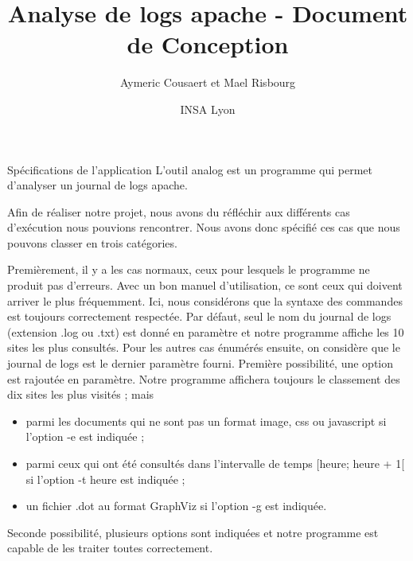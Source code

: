 \documentclass[11pt]{article}
\date{INSA Lyon}
\title{Analyse de logs apache - Document de Conception}
\author{Aymeric Cousaert et Mael Risbourg}
\begin{document}
\maketitle

\vspace{1cm}
\tableofcontents
\vspace{1cm}

\begin{section}{Spécifications de l'application}
L'outil analog est un programme qui permet d'analyser un journal de logs apache.

Afin de réaliser notre projet, nous avons du réfléchir aux différents cas d'exécution nous pouvions rencontrer. Nous avons donc spécifié ces cas que nous pouvons classer en trois catégories.
 \newline
 
Premièrement, il y a les cas normaux, ceux pour lesquels le programme ne produit pas d'erreurs. Avec un bon manuel d'utilisation, ce sont ceux qui doivent arriver le plus fréquemment. Ici, nous considérons que la syntaxe des commandes est toujours correctement respectée. Par défaut, seul le nom du journal de logs (extension .log ou .txt) est donné en paramètre et notre programme affiche les 10 sites les plus consultés. Pour les autres cas énumérés ensuite, on considère que le journal de logs est le dernier paramètre fourni. 
Première possibilité, une option est rajoutée en paramètre. Notre programme affichera toujours le classement des dix sites les plus visités ; mais 
\begin{itemize}
\item parmi les documents qui ne sont pas un format image, css ou javascript si l'option -e est indiquée ;
\item parmi ceux qui ont été consultés dans l'intervalle de temps [heure;  heure  + 1[ si l'option -t heure est indiquée ;
\item un fichier .dot au format GraphViz si l'option -g est indiquée.
\end{itemize} 
Seconde possibilité, plusieurs options sont indiquées et notre programme est capable de les traiter toutes correctement.
 \newline
 

\end{section}
\end{document}
